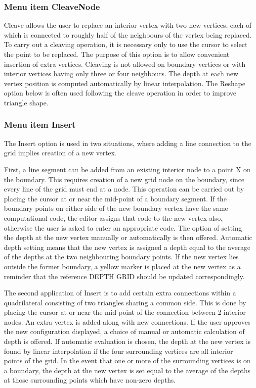 \documentclass{article}
\begin{document}
\subsubsection[Menu item CleaveNode]{Menu item CleaveNode}
Cleave allows the user to replace an interior vertex with two new vertices, each of which is connected to roughly half of the neighbours of the vertex being replaced. To carry out a cleaving operation, it is necessary only to use the cursor to select the point to be replaced. The purpose of this option is to allow convenient insertion of extra vertices. Cleaving is not allowed on boundary vertices or with interior vertices having only three or four neighbours. The depth at each new vertex position is computed automatically by linear interpolation. The Reshape option below is often used following the cleave operation in order to improve triangle shape.

\subsubsection[Menu item Insert]{Menu item Insert}
The Insert option is used in two situations, where adding a line connection to the grid implies creation of a new vertex. 

First, a line segment can be added from an existing interior node to a point X on the boundary. This requires creation of a new grid node on the boundary, since every line of the grid must end at a node. This operation can be carried out by placing the cursor at or near the mid-point of a boundary segment. If the boundary points on either side of the new boundary vertex have the same computational code, the editor assigns that code to the new vertex also, otherwise the user is asked to enter an appropriate code. The option of setting the depth at the new vertex manually or automatically is then offered. Automatic depth setting means that the new vertex is assigned a depth equal to the average of the depths at the two neighbouring boundary points. If the new vertex lies outside the former boundary, a yellow marker is placed at the new vertex as a reminder that the reference DEPTH GRID should be updated correspondingly.

The second application of Insert is to add certain extra connections within a quadrilateral consisting of two triangles sharing a common side. This is done by placing the cursor at or near the mid-point of the connection between 2 interior nodes. An extra vertex is added along with new connections. If the user approves the new configuration displayed, a choice of manual or automatic calculation of depth is offered. If automatic evaluation is chosen, the depth at the new vertex is found by linear interpolation if the four surrounding vertices are all interior points of the grid. In the event that one or more of the surrounding vertices is on a boundary, the depth at the new vertex is set equal to the average of the depths at those surrounding points which have non-zero depths.
\end{document}
